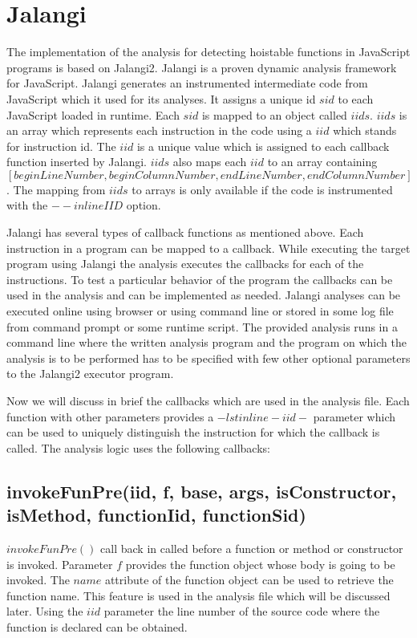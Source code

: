 \documentclass[accentcolor=tud0b,12pt,paper=a4]{tudreport}
\begin{document}
\chapter{Jalangi}
The implementation of the analysis for detecting hoistable functions in JavaScript programs is based on Jalangi2. Jalangi is a proven dynamic analysis framework for JavaScript. Jalangi generates an instrumented intermediate code from JavaScript
which it used for its analyses. It assigns a unique id $sid$ to each JavaScript loaded in runtime. Each $sid$ is mapped to an object called $iids$. $iids$ is an array which represents each instruction in the code using a $iid$ which stands for instruction id. The $iid$ is a unique value which is assigned to each callback function inserted by Jalangi. $iids$ also maps each $iid$ to an array containing $[beginLineNumber, beginColumnNumber, endLineNumber, endColumnNumber]$. The mapping from $iids$ to arrays is only available if the code is instrumented with the $--inlineIID$ option.

\newblock Jalangi has several types of callback functions as mentioned above. Each instruction in a program can be mapped to a callback. While executing the target program using Jalangi the analysis executes the callbacks for each of the instructions. To test a particular behavior of the program the callbacks can be used in the analysis and can be implemented as needed. Jalangi analyses can be executed online using browser or using command line or stored in some log file from command prompt or some runtime script. The provided analysis runs in a command line where the written analysis program and the program on which the analysis is to be performed has to be specified with few other optional parameters to the Jalangi2 executor program.

\newblock Now we will discuss in brief the callbacks which are used in the analysis file. Each function with other parameters provides a $-lstinline-iid-$ parameter which can be used to uniquely distinguish the instruction for which the callback is called. The analysis logic uses the following callbacks:
\section{invokeFunPre(iid, f, base, args, isConstructor, isMethod, functionIid, functionSid)} 
$invokeFunPre()$ call back in called before a function or method or constructor is invoked. Parameter $f$ provides the function object whose body is going to be invoked. The $name$ attribute of the function object can be used to retrieve the function name. This feature is used in the analysis file which will be discussed later. Using the $iid$ parameter the line number of the source code where the function is declared can be obtained.
\end{document}
